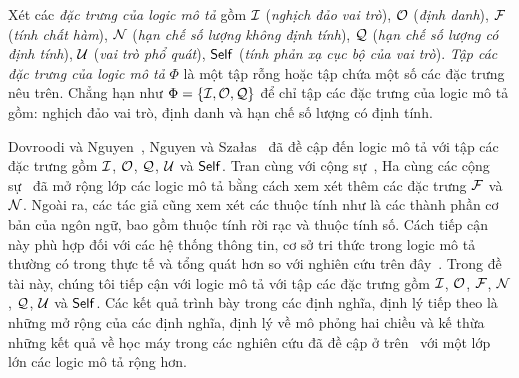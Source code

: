 Xét các {\em đặc trưng của logic mô tả} gồm $\mathcal{I}$ ({\em nghịch đảo vai trò}), $\mathcal{O}$ ({\em định danh}), $\mathcal{F}$ ({\em tính chất hàm}), $\mathcal{N}$ ({\em hạn chế số lượng không định tính}), $\mathcal{Q}$ ({\em hạn chế số lượng có định tính}), $\mathcal{U}$ ({\em vai trò phổ quát}), $\mathsf{Self}$ ({\em tính phản xạ cục bộ của vai trò}). {\em Tập các đặc trưng của logic mô tả} $\Phi$ là một tập rỗng hoặc tập chứa một số các đặc trưng nêu trên. Chẳng hạn như $\Phi = \{\mathcal{I}, \mathcal{O}, \mathcal{Q}\}$ để chỉ tập các đặc trưng của logic mô tả gồm: nghịch đảo vai trò, định danh và hạn chế số lượng có định tính.

Dovroodi và Nguyen~\cite{Divroodi2011B}, Nguyen và Sza{\l}as~\cite{Nguyen2013} đã đề cập đến logic mô tả \ALCreg với tập các đặc trưng gồm $\mathcal{I}$, $\mathcal{O}$, $\mathcal{Q}$, $\mathcal{U}$ và $\mathsf{Self}$. Tran cùng với cộng sự~\cite{Tran2012}, Ha cùng các cộng sự~\cite{Ha2012} đã mở rộng lớp các logic mô tả bằng cách xem xét thêm các đặc trưng $\mathcal{F}$ và $\mathcal{N}$. Ngoài ra, các tác giả cũng xem xét các thuộc tính như là các thành phần cơ bản của ngôn ngữ, bao gồm thuộc tính rời rạc và thuộc tính số. Cách tiếp cận này phù hợp đối với các hệ thống thông tin, cơ sở tri thức trong logic mô tả thường có trong thực tế và tổng quát hơn so với nghiên cứu trên đây~\cite{Nguyen2013}.
Trong đề tài này, chúng tôi tiếp cận với logic mô tả \ALCreg với tập các đặc trưng gồm $\mathcal{I}$, $\mathcal{O}$, $\mathcal{F}$, $\mathcal{N}$, $\mathcal{Q}$, $\mathcal{U}$ và $\mathsf{Self}$. Các kết quả trình bày trong các định nghĩa, định lý tiếp theo là những mở rộng của các định nghĩa, định lý về mô phỏng hai chiều và kế thừa những kết quả về học máy trong các nghiên cứu đã đề cập ở trên~\cite{Divroodi2011B,Nguyen2013,Tran2012,Ha2012} với một lớp lớn các logic mô tả rộng hơn.


